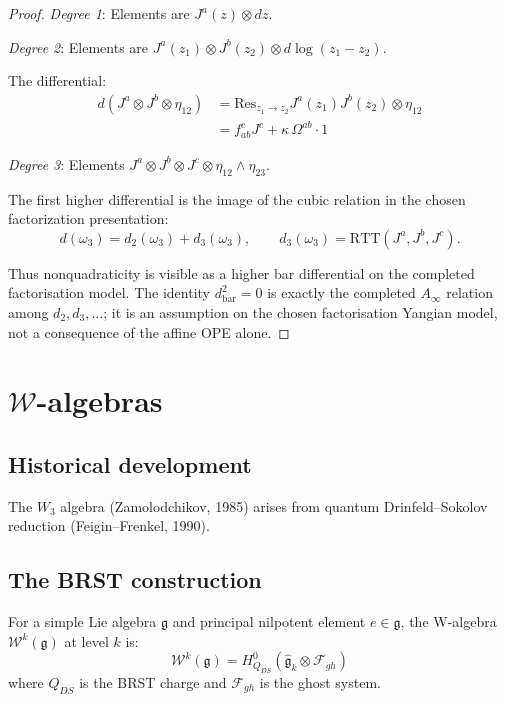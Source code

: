 \begin{proof}
\emph{Degree 1}: Elements are $J^a(z) \otimes dz$.

\emph{Degree 2}: Elements are $J^a(z_1) \otimes J^b(z_2) \otimes d\log(z_1 - z_2)$.

The differential:
\begin{align}
d(J^a \otimes J^b \otimes \eta_{12}) &= \text{Res}_{z_1 \to z_2} J^a(z_1)J^b(z_2) \otimes \eta_{12} \\
&= f_{ab}^c J^c + \kappa\, \Omega^{ab} \cdot 1
\end{align}

\emph{Degree 3}: Elements $J^a \otimes J^b \otimes J^c \otimes \eta_{12} \wedge \eta_{23}$.

The first higher differential is the image of the cubic relation in
the chosen factorization presentation:
\[
d(\omega_3) = d_2(\omega_3) + d_3(\omega_3),
\qquad
d_3(\omega_3)=\mathrm{RTT}(J^a,J^b,J^c).
\]

Thus nonquadraticity is visible as a higher bar differential on the
completed factorisation model.  The identity
$d_{\mathrm{bar}}^2=0$ is exactly the completed $A_\infty$ relation
among $d_2,d_3,\ldots$; it is an assumption on the chosen
factorisation Yangian model, not a consequence of the affine OPE
alone. \qedhere
\end{proof}




\section{$\mathcal{W}$-algebras}
\label{sec:w-algebras-kps}

\subsection{Historical development}

The $W_3$ algebra (Zamolodchikov, 1985) arises from quantum Drinfeld--Sokolov reduction (Feigin--Frenkel, 1990).

\subsection{The BRST construction}

\begin{definition}
For a simple Lie algebra $\mathfrak{g}$ and principal nilpotent element $e \in \mathfrak{g}$, the W-algebra $\mathcal{W}^k(\mathfrak{g})$ at level $k$ is:
\[
\mathcal{W}^k(\mathfrak{g}) = H^0_{Q_{DS}}(\hat{\mathfrak{g}}_k \otimes \mathcal{F}_{gh})
\]
where $Q_{DS}$ is the BRST charge and $\mathcal{F}_{gh}$ is the ghost system.
\end{definition}

